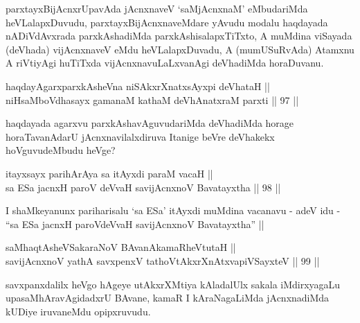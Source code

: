 \begin{artha}
\footnotemark[2]parxtayxBijAcnxrUpavAda jAcnxnaveV `saMjAcnxnaM' eMbudariMda\break
heVLalapxDuvudu, parxtayxBijAcnxnaveMdare yAvudu modalu haqdayada
nADiVdAvxrada parxkAshadiMda parxkAshisalapxTiTxto, A muMdina viSayada
(deVhada) vijAcnxnaveV eMdu heVLalapxDuvadu, A (mumUSuRvAda) Atamxnu A
riVtiyAgi huTiTxda vijAcnxnavuLaLxvanAgi deVhadiMda horaDuvanu.
\end{artha}


\begin{shl}
haqdayAgarxparxkAsheVna niSAkxrXnatxsAyxpi deVhataH || \\
niHsaMboVdhasayx gamanaM kathaM deVhAnatxraM parxti \hfill || 97 || 
\end{shl}

\begin{artha}
haqdayada agarxvu parxkAshavAguvudariMda deVhadiMda horage
horaTavanAdarU jAcnxnavilalxdiruva Itanige beVre deVhakekx
hoVguvudeMbudu heVge?
\end{artha}


\begin{shl}
itayxsayx parihArAya sa itAyxdi paraM vacaH || \\
sa ESa jacnxH paroV deVvaH savijAcnxnoV Bavatayxtha \hfill || 98 ||  
\end{shl}

\begin{artha}
I shaMkeyanunx pariharisalu `sa ESa' itAyxdi muMdina vacanavu - adeV
idu - ``sa ESa jacnxH paroVdeVvaH savijAcnxnoV Bavatayxtha'' || 
\end{artha}


\begin{shl}
saMhaqtAsheVSakaraNoV BAvanAkamaRheVtutaH || \\
savijAcnxnoV yathA savxpenxV tathoVtAkxrXnAtxvapiVSayxteV \hfill || 99 ||  
\end{shl}

\begin{artha}
savxpanxdalilx heVgo hAgeye utAkxrXMtiya kAladalUlx sakala\break
iMdirxyagaLu upasaMhAravAgidadxrU BAvane, kamaR I kAraNagaLiMda
jAcnxnadiMda kUDiye iruvaneMdu opipxruvudu.
\end{artha}


